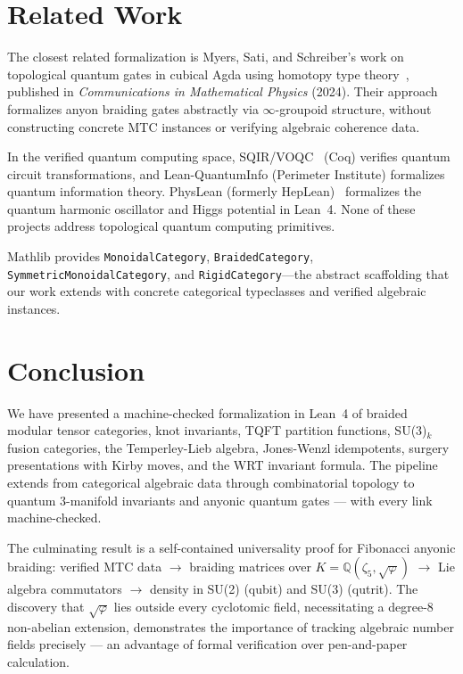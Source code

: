 \documentclass[12pt]{article}
\newcommand{\lean}[1]{\texttt{#1}}
\begin{document}
\section{Related Work}
\label{sec:related}

The closest related formalization is Myers, Sati, and Schreiber's work on topological quantum gates in cubical Agda using homotopy type theory~\cite{mss2024}, published in \emph{Communications in Mathematical Physics} (2024). Their approach formalizes anyon braiding gates abstractly via $\infty$-groupoid structure, without constructing concrete MTC instances or verifying algebraic coherence data.

In the verified quantum computing space, SQIR/VOQC~\cite{hietala2021} (Coq) verifies quantum circuit transformations, and Lean-QuantumInfo (Perimeter Institute) formalizes quantum information theory. PhysLean (formerly HepLean)~\cite{physlean} formalizes the quantum harmonic oscillator and Higgs potential in Lean~4. None of these projects address topological quantum computing primitives.

Mathlib provides \lean{MonoidalCategory}, \lean{BraidedCategory}, \lean{SymmetricMonoidalCategory}, and \lean{RigidCategory}---the abstract scaffolding that our work extends with concrete categorical typeclasses and verified algebraic instances.

\section{Conclusion}
\label{sec:conclusion}

We have presented a machine-checked formalization in Lean~4 of braided
modular tensor categories, knot invariants, TQFT partition functions,
SU(3)$_k$ fusion categories, the Temperley-Lieb algebra, Jones-Wenzl
idempotents, surgery presentations with Kirby moves, and the WRT
invariant formula.  The pipeline extends from
categorical algebraic data through combinatorial topology to quantum
3-manifold invariants and anyonic quantum gates --- with every link
machine-checked.

The culminating result is a self-contained universality proof for
Fibonacci anyonic braiding: verified MTC data $\to$ braiding matrices
over $K = \mathbb{Q}(\zeta_5, \sqrt{\varphi})$ $\to$ Lie algebra
commutators $\to$ density in SU(2) (qubit) and SU(3) (qutrit).  The
discovery that $\sqrt{\varphi}$ lies outside every cyclotomic field,
necessitating a degree-8 non-abelian extension, demonstrates the
importance of tracking algebraic number fields precisely --- an
advantage of formal verification over pen-and-paper calculation.
\end{document}

